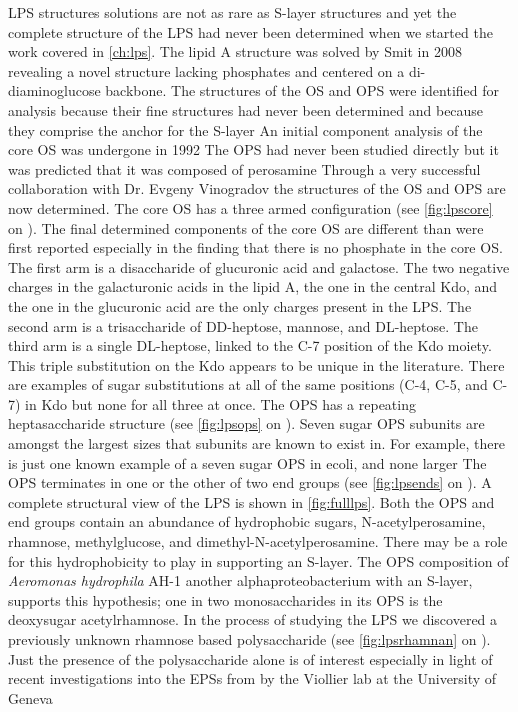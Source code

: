 \ac{LPS} structures solutions are not as rare as \ac{S-layer} structures and yet
the complete structure of the \caulobacter{} \ac{LPS} had never been determined
when we started the work covered in \cref{ch:lps}. The \caulobacter{} lipid A
structure was solved by Smit \etal{} in 2008
revealing a novel structure lacking phosphates and centered on a
di-diaminoglucose backbone. The structures of the \ac{OS} and \ac{OPS} were
identified for analysis because their fine structures had never been determined
and because they comprise the anchor for the \caulobacter{}
\ac{S-layer} An initial component analysis of the core
\ac{OS} was undergone in 1992 The \ac{OPS} had never
been studied directly but it was predicted that it was composed of
perosamine Through a very successful collaboration with
Dr. Evgeny Vinogradov the structures of the \caulobacter{} \ac{OS} and \ac{OPS}
are now determined. The core \ac{OS} has a three armed configuration (see
\cref{fig:lpscore} on ). The final determined components
of the core \ac{OS} are different than were first
reported especially in the finding that there is no
phosphate in the core \ac{OS}. The first arm is a disaccharide of glucuronic
acid and galactose. The two negative charges in the galacturonic acids in the
lipid A, the one in the central Kdo, and the one in the glucuronic acid are the
only charges present in the \caulobacter{} \ac{LPS}. The second arm is a
trisaccharide of DD-heptose, mannose, and DL-heptose. The third arm is a single
DL-heptose, linked to the C-7 position of the Kdo moiety. This triple
substitution on the Kdo appears to be unique in the literature. There are
examples of sugar substitutions at all of the same positions (C-4, C-5, and C-7)
in Kdo but none for all three at once. The \ac{OPS} has a repeating
heptasaccharide structure (see \cref{fig:lpsops} on ).
Seven sugar \ac{OPS} subunits are amongst the largest sizes that subunits are
known to exist in. For example, there is just one known example of a seven sugar
\ac{OPS} in \acl{ecoli}, and none larger The
\caulobacter{} \ac{OPS} terminates in one or the other of two end groups (see
\cref{fig:lpsends} on ).  A complete structural view of
the \caulobacter \ac{LPS} is shown in \cref{fig:fulllps}. Both the \ac{OPS} and end groups contain an abundance of hydrophobic sugars, \ie N-acetylperosamine, rhamnose, methylglucose, and dimethyl-N-acetylperosamine. There may be a role for this hydrophobicity to play in supporting an \ac{S-layer}. The \ac{OPS} composition of \textit{Aeromonas hydrophila} AH-1 another alphaproteobacterium with an \ac{S-layer}, supports this hypothesis; one in two monosaccharides in its \ac{OPS} is the deoxysugar acetylrhamnose. In the process of studying the \caulobacter{} \ac{LPS} we discovered a previously unknown rhamnose based polysaccharide (see \cref{fig:lpsrhamnan} on ). Just the presence of the polysaccharide alone is of interest especially in light of recent investigations into the \acp{EPS} from \caulobacter{} by the Viollier lab at the University of Geneva  

